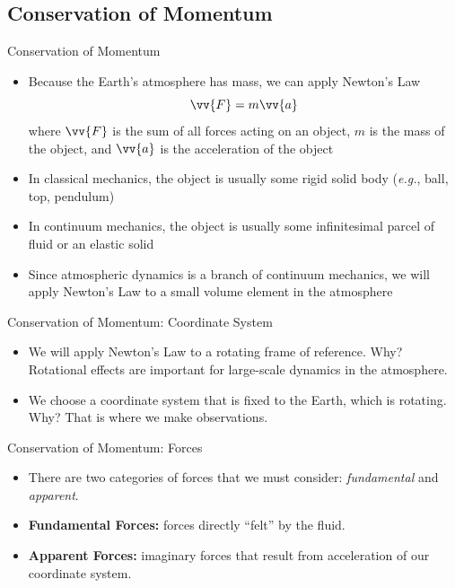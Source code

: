 \subsection{Conservation of Momentum}
\begin{frame}{Conservation of Momentum}
\begin{itemize}
	\item Because the Earth's atmosphere has mass, we can apply Newton's  Law
	$$\vv{F} = m \vv{a}$$
	where $\vv{F}$ is the sum of all forces acting on an object, $m$ is the mass of the object, and $\vv{a}$ is the acceleration of the object
	\item In classical mechanics, the object is usually some rigid solid body (\textit{e.g.}, ball, top, pendulum)
	\item In continuum mechanics, the object is usually some infinitesimal parcel of fluid or an elastic solid
	\item Since atmospheric dynamics is a branch of continuum mechanics, we will apply Newton's  Law to a small volume element in the atmosphere
\end{itemize}
\end{frame}
\begin{frame}{Conservation of Momentum: Coordinate System}
\begin{itemize}
	\item We will apply Newton's  Law to a rotating frame of reference. Why? Rotational effects are important for large-scale dynamics in the atmosphere.
	\item We choose a coordinate system that is fixed to the Earth, which is rotating. Why? That is where we make observations.
\end{itemize}
\end{frame}
\begin{frame}{Conservation of Momentum: Forces}
\begin{itemize}
	\item There are two categories of forces that we must consider: \textit{fundamental} and \textit{apparent}.
	\item \textbf{Fundamental Forces:} forces directly ``felt'' by the fluid.
	\item \textbf{Apparent Forces:} imaginary forces that result from acceleration of our coordinate system.
\end{itemize}
\end{frame}
